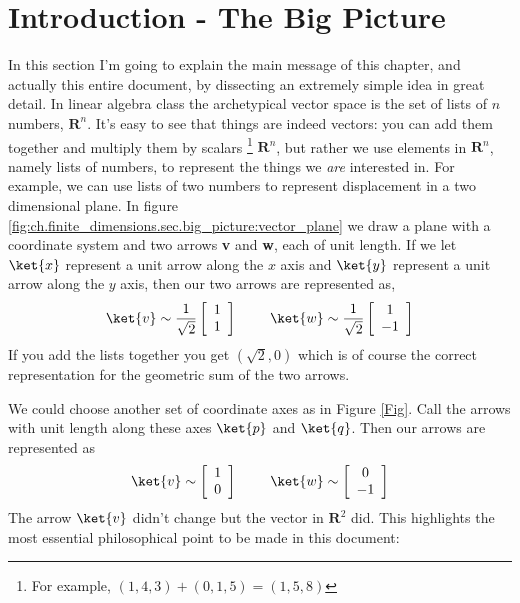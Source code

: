 \section{Introduction - The Big Picture}
In this section I'm going to explain the main message of this chapter, and actually this entire document, by dissecting an extremely simple idea in great detail.
In linear algebra class the archetypical vector space is the set of lists of $n$ numbers, $\textbf{R}^n$.
It's easy to see that things are indeed vectors: you can add them together and multiply them by scalars \footnote{For example, $(1,4,3)+(0,1,5)=(1,5,8)$}  $\textbf{R}^n$, but rather we use elements in $\textbf{R}^n$, namely lists of numbers, to represent the things we \emph{are} interested in.
For example, we can use lists of two numbers to represent displacement in a two dimensional plane.
In figure \ref{fig:ch.finite_dimensions.sec.big_picture:vector_plane} we draw a plane with a coordinate system and two arrows \textbf{v} and \textbf{w}, each of unit length.
If we let $\ket{x}$ represent a unit arrow along the $x$ axis and $\ket{y}$ represent a unit arrow along the $y$ axis, then our two arrows are represented as,
\begin{equation}
\ket{v} \sim \frac{1}{\sqrt{2}} \left[ \begin{array}{c} 1 \\ 1 \end{array} \right] \
\qquad \ket{w} \sim \frac{1}{\sqrt{2}} \left[ \begin{array}{c} 1 \\ -1 \end{array} \right]
\end{equation}
If you add the lists together you get $(\sqrt{2},0)$ which is of course the correct representation for the geometric sum of the two arrows.

We could choose another set of coordinate axes as in Figure \ref{Fig}.
Call the arrows with unit length along these axes $\ket{p}$ and $\ket{q}$.
Then our arrows are represented as
\begin{displaymath}
\ket{v}\sim \left[\begin{array}{c} 1 \\ 0 \end{array} \right] \qquad \
\ket{w}\sim \left[\begin{array}{c} 0 \\ -1 \end{array} \right]
\end{displaymath}
The arrow $\ket{v}$ didn't change but the vector in $\textbf{R}^2$ did.
This highlights the most essential philosophical point to be made in this document: 

